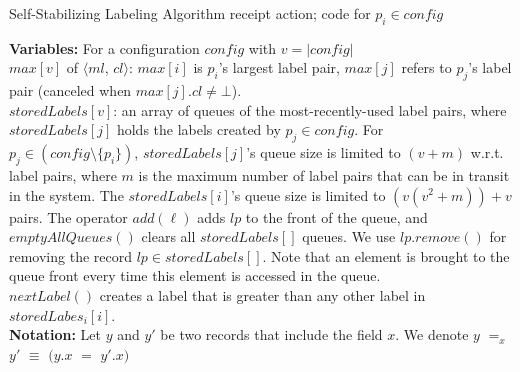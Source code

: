 \documentclass[11pt]{article}
\begin{document}
\begin{algorithm*}[t!]
\caption{{Self-Stabilizing Labeling Algorithm receipt action; code for $p_i \in config$}}
\label{alg:receiveLabels}


\begin{small}

{\bf Variables:} For a configuration $config$ with $v = |config|$\\
$max[v]$ of $\langle ml$, $cl \rangle$: $max[i]$ is $p_i$'s largest label pair, $max[j]$ refers to $p_j$'s label pair (canceled when $max[j].cl \neq \bot$).\\

$storedLabels[v]$: an array of queues of the most-recently-used label pairs, where $storedLabels[j]$ holds the labels created by $p_j \in config$. For $p_j \in (config \setminus \{ p_i \})$, $storedLabels[j]$'s queue size is limited to $(v+m)$ w.r.t. label pairs, where $m$ is the maximum number of label pairs that can be in transit in the system. The $storedLabels[i]$'s queue size is limited to $(v(v^2+m))+v$ pairs. The operator $add(\ell)$ adds $lp$ to the front of the queue, and $emptyAllQueues()$ clears all $storedLabels[]$ queues. We use $lp.remove()$ for removing the record $lp \in storedLabels[]$. Note that an element is brought to the queue front every time this element is accessed in the queue.\\
$nextLabel()$ creates a label that is greater than any other label in $storedLabes_i[i]$.\\










{\bf Notation:} Let $y$ and $y'$ be two records that include the field $x$. We denote  $y$ $=_{x}$ $y'$ $\equiv$ $(y.x$ $=$ $y'.x)$\\


\end{small}
\end{algorithm*}
\end{document}
